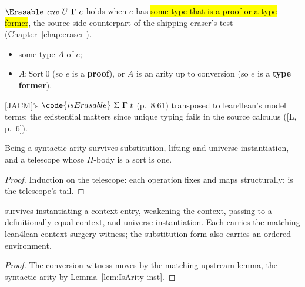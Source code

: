 \begin{definition}[Erasability]
\label{def:Erasable}
\leanok
{}
 $\Erasable\ \mathit{env}\ U\ \Gamma\ e$ holds when $e$ has \hl{some type that is a proof or a type former}, the source-side counterpart of the shipping eraser's test (Chapter~\ref{chap:eraser}).
\begin{itemize}
\item {} some type $A$ of $e$;
\item {} $A : \mathrm{Sort}\ 0$ (so $e$ is a \textbf{proof}), or $A$ is an arity up to conversion (so $e$ is a \textbf{type former}).
\end{itemize}
 [JACM]'s $\code{isErasable}\ \Sigma\ \Gamma\ t$ (p.\ 8:61) transposed to lean4lean's model terms; the existential matters since unique typing fails in the source calculus ([L, p.\ 6]).
\end{definition}

\begin{lemma}
\label{lem:IsArity-inst}
\leanok
{}
 Being a syntactic arity survives substitution, lifting and universe instantiation, and a telescope whose $\Pi$-body is a sort is one.
\end{lemma}
\begin{proof}
\leanok
{}
 Induction on the telescope: each operation fixes  and maps  structurally;  is the telescope's tail.
\end{proof}

\begin{lemma}
\label{lem:IsArityUpTo-inst}
\leanok
{}
  survives instantiating a context entry, weakening the context, passing to a definitionally equal context, and universe instantiation.
 Each carries the matching lean4lean context-surgery witness; the substitution form also carries an ordered environment.
\end{lemma}
\begin{proof}
\leanok
{}
 The conversion witness moves by the matching upstream lemma, the syntactic arity by Lemma~\ref{lem:IsArity-inst}.
\end{proof}

